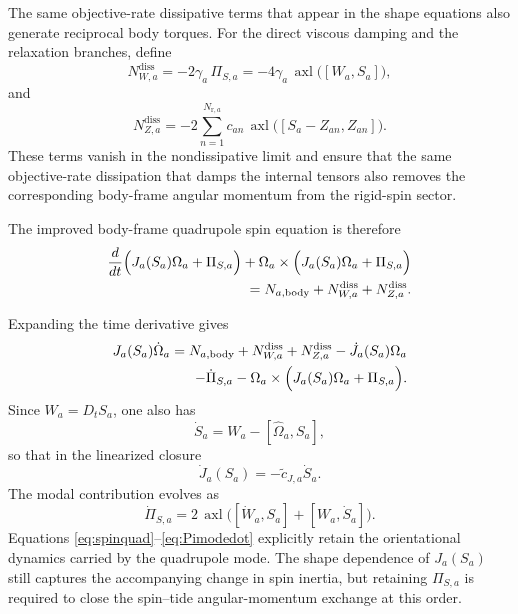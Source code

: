 \documentclass[journal, a4paper]{IEEEtran}
\begin{document}
The same objective-rate dissipative terms that appear in the shape equations
also generate reciprocal body torques. For the direct viscous damping and the
relaxation branches, define
\begin{equation}
N^{\mathrm{diss}}_{W,a}
=
-2\gamma_a\,\Pi_{S,a}
=
-4\gamma_a\,\operatorname{axl}\!\bigl([W_a,S_a]\bigr),
\label{eq:NdissW}
\end{equation}
and
\begin{equation}
N^{\mathrm{diss}}_{Z,a}
=
-2\sum_{n=1}^{N_{\mathrm{r},a}}
 c_{an}\,\operatorname{axl}\!\bigl([S_a-Z_{an},Z_{an}]\bigr).
\label{eq:NdissZ}
\end{equation}
These terms vanish in the nondissipative limit and ensure that the same
objective-rate dissipation that damps the internal tensors also removes the
corresponding body-frame angular momentum from the rigid-spin sector.

The improved body-frame quadrupole spin equation is therefore
\begin{align}
\frac{d}{dt}\Bigl(J_a(S_a)\Omega_a+\Pi_{S,a}\Bigr)
+
\Omega_a\times
\Bigl(J_a(S_a)\Omega_a+\Pi_{S,a}\Bigr)
\nonumber \\= 
N_{a,\mathrm{body}}
+
N^{\mathrm{diss}}_{W,a}
+
N^{\mathrm{diss}}_{Z,a}.
\label{eq:spinquad}
\end{align}

Expanding the time derivative gives
\begin{align}
J_a(S_a)\dot\Omega_a
=
N_{a,\mathrm{body}}
+
N^{\mathrm{diss}}_{W,a}
+
N^{\mathrm{diss}}_{Z,a}
-
\dot J_a(S_a)\Omega_a \nonumber \\
-
\dot\Pi_{S,a}
-
\Omega_a\times
\Bigl(J_a(S_a)\Omega_a+\Pi_{S,a}\Bigr).
\label{eq:spinexpanded}
\end{align}
Since $W_a=D_tS_a$, one also has
\begin{equation}
\dot S_a = W_a-[\widehat{\Omega}_a,S_a],
\label{eq:SdotFromW}
\end{equation}
so that in the linearized closure
\begin{equation}
\dot J_a(S_a)=-\tilde c_{J,a}\dot S_a.
\label{eq:JdotS}
\end{equation}
The modal contribution evolves as
\begin{equation}
\dot\Pi_{S,a}
=
2\,\operatorname{axl}\!\bigl([\dot W_a,S_a]+[W_a,\dot S_a]\bigr).
\label{eq:Pimodedot}
\end{equation}
Equations \eqref{eq:spinquad}--\eqref{eq:Pimodedot} explicitly retain the
orientational dynamics carried by the quadrupole mode. The shape dependence of
$J_a(S_a)$ still captures the accompanying change in spin inertia, but
retaining $\Pi_{S,a}$ is required to close the spin--tide angular-momentum
exchange at this order.
\end{document}
